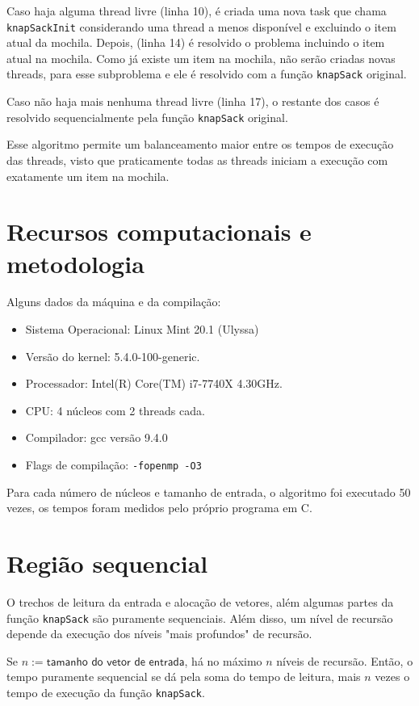 \documentclass{article}
\begin{document}
Caso haja alguma thread livre (linha 10), é criada uma nova 
task que chama \texttt{knapSackInit} considerando uma thread 
a menos disponível e excluindo o item atual da mochila.
Depois, (linha 14) é resolvido o problema incluindo o item atual na mochila.
Como já existe um item na mochila, não serão criadas novas threads, 
para esse subproblema e ele é resolvido com a função \texttt{knapSack}
 original.

Caso não haja mais nenhuma thread livre (linha 17), o restante dos
casos é resolvido sequencialmente pela função \texttt{knapSack}
original.

Esse algoritmo permite um balanceamento maior entre os tempos
de execução das threads, visto que praticamente todas as threads
iniciam a execução com exatamente um item na mochila.

\section{Recursos computacionais e metodologia}

Alguns dados da máquina e da compilação:
\begin{itemize}
  \item Sistema Operacional: Linux Mint 20.1 (Ulyssa)
  \item Versão do kernel: 5.4.0-100-generic.
  \item Processador: Intel(R) Core(TM) i7-7740X 4.30GHz.
  \item CPU: 4 núcleos com 2 threads cada.
  \item Compilador: gcc versão 9.4.0
  \item Flags de compilação: \texttt{-fopenmp -O3}
\end{itemize}

Para cada número de núcleos e tamanho de entrada, o algoritmo
foi executado 50 vezes, os tempos foram medidos pelo próprio 
programa em C.

\section{Região sequencial}
O trechos de leitura da entrada e alocação de vetores, além algumas partes da
função \texttt{knapSack} são puramente sequenciais.
Além disso, um nível de recursão depende da execução
dos níveis "mais profundos" de recursão.

Se $n:= \textsf{tamanho do vetor de entrada}$, há no máximo
$n$ níveis de recursão. Então, o tempo puramente
sequencial se dá pela soma do tempo de leitura, mais $n$ vezes
o tempo de execução da função \texttt{knapSack}.
\end{document}
